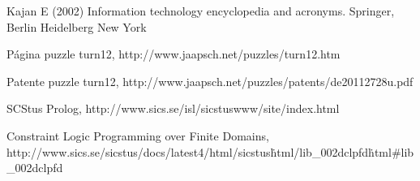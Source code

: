 %
%

%
% 
% 
%
\begin{thebibliography}{99.}
%
%
%
 Kajan E (2002)
Information technology encyclopedia and acronyms. Springer, Berlin
Heidelberg New York

 Página puzzle turn12, http://www.jaapsch.net/puzzles/turn12.htm

 Patente puzzle turn12, http://www.jaapsch.net/puzzles/patents/de20112728u.pdf

 SCStus Prolog, http://www.sics.se/isl/sicstuswww/site/index.html

 Constraint Logic Programming over Finite Domains,\\
http://www.sics.se/sicstus/docs/latest4/html/sicstus\.html/lib\_002dclpfd\.html\#lib\_002dclpfd

\end{thebibliography}
